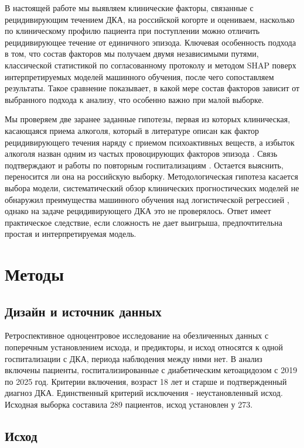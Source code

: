 \documentclass[pdflatex,sn-basic,Numbered]{sn-jnl}
\begin{document}
В настоящей работе мы выявляем клинические факторы, связанные с рецидивирующим течением ДКА, на российской когорте и оцениваем, насколько по клиническому профилю пациента при поступлении можно отличить рецидивирующее течение от единичного эпизода. Ключевая особенность подхода в том, что состав факторов мы получаем двумя независимыми путями, классической статистикой по согласованному протоколу и методом SHAP поверх интерпретируемых моделей машинного обучения, после чего сопоставляем результаты. Такое сравнение показывает, в какой мере состав факторов зависит от выбранного подхода к анализу, что особенно важно при малой выборке.

Мы проверяем две заранее заданные гипотезы, первая из которых клиническая, касающаяся приема алкоголя, который в литературе описан как фактор рецидивирующего течения наряду с приемом психоактивных веществ, а избыток алкоголя назван одним из частых провоцирующих факторов эпизода \cite{ref7}. Связь подтверждают и работы по повторным госпитализациям \cite{ref9,ref16}. Остается выяснить, переносится ли она на российскую выборку. Методологическая гипотеза касается выбора модели, систематический обзор клинических прогностических моделей не обнаружил преимущества машинного обучения над логистической регрессией \cite{ref17}, однако на задаче рецидивирующего ДКА это не проверялось. Ответ имеет практическое следствие, если сложность не дает выигрыша, предпочтительна простая и интерпретируемая модель.

\section{Методы}\label{sec2}

\subsection{Дизайн и источник данных}\label{subsec2_1}

Ретроспективное одноцентровое исследование на обезличенных данных с поперечным установлением исхода, и предикторы, и исход относятся к одной госпитализации с ДКА, периода наблюдения между ними нет. В анализ включены пациенты, госпитализированные с диабетическим кетоацидозом с 2019 по 2025 год. Критерии включения, возраст 18 лет и старше и подтвержденный диагноз ДКА. Единственный критерий исключения - неустановленный исход. Исходная выборка составила 289 пациентов, исход установлен у 273.

\subsection{Исход}\label{subsec2_2}
\end{document}
